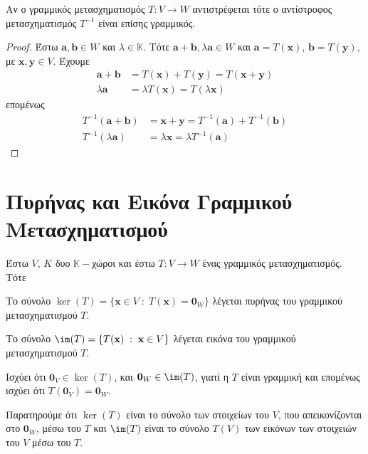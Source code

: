 \begin{prop}
  Αν ο γραμμικός μετασχηματισμός $ T \colon V \to W $ αντιστρέφεται τότε ο αντίστροφος 
  μετασχηματισμός $ T^{-1} $ είναι επίσης γραμμικός.
\end{prop}
\begin{proof}
  Έστω $ \mathbf{a}, \mathbf{b} \in W $ και $ \lambda \in \mathbb{K} $. Τότε 
  $ \mathbf{a} + \mathbf{b}, \lambda \mathbf{a} \in W $ και 
  $ \mathbf{a}= T(\mathbf{x}) $, $ \mathbf{b} = T(\mathbf{y}) $, με 
  $ \mathbf{x}, \mathbf{y} \in V $. Έχουμε
  \begin{align*}
    \mathbf{a}+ \mathbf{b} &= T(\mathbf{x}) + T(\mathbf{y}) = T(\mathbf{x}+ \mathbf{y})\\
    \lambda \mathbf{a} &= \lambda T(\mathbf{x}) = T(\lambda \mathbf{x})
  \end{align*}
  επομένως
  \begin{align*}
    T^{-1} (\mathbf{a}+ \mathbf{b}) &= \mathbf{x} + \mathbf{y} = T^{-1} (\mathbf{a}) 
    + T^{-1} (\mathbf{b}) \\
    T^{-1} (\lambda \mathbf{a}) &= \lambda \mathbf{x} = \lambda T^{-1} (\mathbf{a})
   \end{align*} 
\end{proof}


\section{Πυρήνας και Εικόνα Γραμμικού Μετασχηματισμού}

\begin{dfn}
  Έστω $V$, $K$ δυο $ \mathbb{K}- $χώροι και έστω $ T \colon V \to W $ ένας 
  γραμμικός μετασχηματισμός. Τότε 
  \begin{myitemize}
    \item Το σύνολο 
      $ \ker(T) = \{ \mathbf{x} \in V \; : \; T(\mathbf{x}) = \mathbf{0}_{W} \} $ 
      λέγεται \textcolor{Col1}{πυρήνας} του γραμμικού μετασχηματισμού $T$.
    \item Το σύνολο 
      $ \im(T) = \{ T(\mathbf{x}) \; : \; \mathbf{x} \in V \} $ 
      λέγεται \textcolor{Col1}{εικόνα} του γραμμικού μετασχηματισμού $T$.
  \end{myitemize}
\end{dfn}

\begin{rem}
\item {}
  \begin{myitemize}
    \item Ισχύει ότι $ \mathbf{0}_{V} \in \ker(T) $, και $ \mathbf{0}_{W} \in \im(T)
      $, γιατί η $T$ είναι γραμμική και επομένως ισχύει ότι 
      $ T(\mathbf{0}_{V}) = \mathbf{0}_{W} $.
    \item Παρατηρούμε ότι $ \ker(T) $ είναι το σύνολο των στοιχείων του $V$, 
      που απεικονίζονται στο $ \mathbf{0}_{W} $, μέσω του $T$ και $ \im(T) $ είναι το 
      σύνολο $ T(V) $ των εικόνων των στοιχειών του $V$ μέσω του $T$.
  \end{myitemize}
\end{rem}

